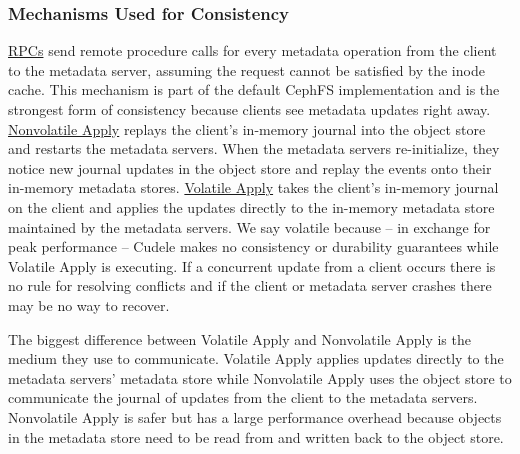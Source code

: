 \subsubsection{Mechanisms Used for Consistency} \underline{RPCs} send remote
procedure calls for every metadata operation from the client to the metadata
server, assuming the request cannot be satisfied by the inode cache. This
mechanism is part of the default CephFS implementation and is the strongest
form of consistency because clients see metadata updates right away.
\underline{Nonvolatile Apply} replays the client's in-memory journal into the
object store and restarts the metadata servers. When the metadata servers
re-initialize, they notice new journal updates in the object store and replay
the events onto their in-memory metadata stores.  \underline{Volatile Apply}
takes the client's in-memory journal on the client and applies the updates
directly to the in-memory metadata store maintained by the metadata servers. We
say volatile because -- in exchange for peak performance -- Cudele makes no
consistency or durability guarantees while Volatile Apply is executing.  If a
concurrent update from a client occurs there is no rule for resolving conflicts
and if the client or metadata server crashes there may be no way to recover.

The biggest difference between Volatile Apply and Nonvolatile Apply is
the medium they use to communicate. Volatile Apply applies updates directly
to the metadata servers' metadata store while Nonvolatile Apply uses the
object store to communicate the journal of updates from the client to the
metadata servers.  Nonvolatile Apply is safer but has a large performance
overhead because objects in the metadata store need to be read from and written
back to the object store.


